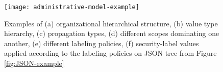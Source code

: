  
 	\begin{figure} [t]
 		\centering
 		\texttt{[image: administrative-model-example]}
 		\caption{Examples of (a) organizational hierarchical structure, (b) value type hierarchy, (c) propagation types, (d) different scopes dominating one another, (e) different labeling policies, (f) security-label values applied according to the labeling policies on JSON tree from Figure \ref{fig:JSON-example}}
 		\label{fig:administrative-model-example}
 	\end{figure}
 